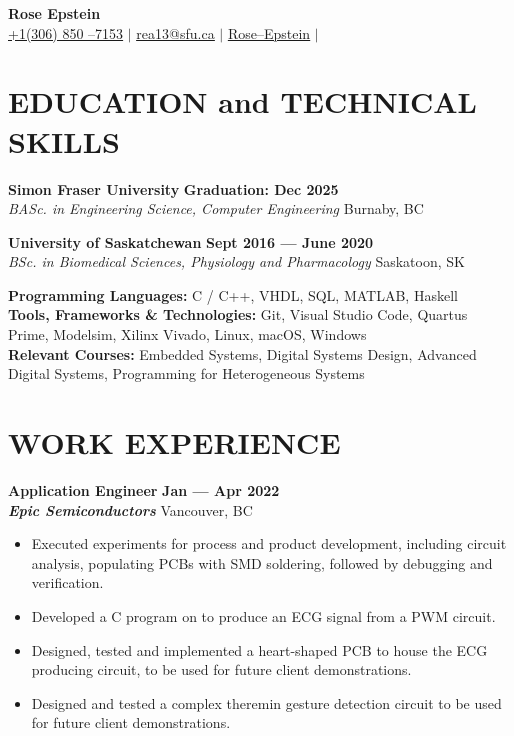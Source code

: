 \documentclass[letterpaper,11pt]{article}
\newcommand{\contact} [4] {
    \begin{center}
        \textbf{\color{colorValue}\Huge #1} \\ \vspace{1pt}
        \small {\faIcon{phone} \underline{#2}} $|$ \href{mailto:#3}{\faIcon{envelope} \underline{#3}} $|$ 
        \href{#4}{\faIcon{linkedin} \underline{Rose--Epstein}} $|$
    \end{center}
}
\newcommand{\Item} [1] {
    \item\small{{#1 \vspace{-2pt}}}
}
\newcommand{\employer} [5] {
    {\textbf{#3} \hfill \textbf{#4 --- #5}\\ \textbf{\emph{#1}} \hfill #2\\}
}
\newcommand{\school} [4] {
    {\textbf{#1} \hfill \textbf{#2}\\ \emph{#3} \hfill #4\\}
}
\newcommand{\workItemListStart} [0] {
    \vspace{-1pt}
    \begin{itemize}[topsep=0pt,itemsep=-2pt]
}
\newcommand{\workItemListEnd} [0] {
    \end{itemize}
    \vspace{1pt}
}
\begin{document}
    \vspace*{-30pt}

    \contact{Rose Epstein}{+1(306) 850 --7153}{rea13@sfu.ca}{https://www.linkedin.com/in/rose-epstein/}

    \section{EDUCATION and TECHNICAL SKILLS}
    \school{Simon Fraser University}{Graduation: Dec 2025}{BASc. in Engineering Science, Computer Engineering}{Burnaby, BC}
    \school{University of Saskatchewan}{Sept 2016 --- June 2020}{BSc. in Biomedical Sciences, Physiology and Pharmacology}{Saskatoon, SK}
    \begin{itemize}[leftmargin=0in, label={}]
    \small{\item{
        \textbf{Programming Languages:}{ C / C++, VHDL, SQL, MATLAB, Haskell} \\
        \textbf{Tools, Frameworks \& Technologies:}{ Git, Visual Studio Code, Quartus Prime, Modelsim, Xilinx Vivado, Linux, macOS, Windows} \\
        \textbf{Relevant Courses:}{ Embedded Systems, Digital Systems Design, Advanced Digital Systems, Programming for Heterogeneous Systems} \\
    }}
    \end{itemize}

    \section{WORK EXPERIENCE}
    \employer{Epic Semiconductors}{Vancouver, BC}{Application Engineer}{Jan}{Apr 2022}
    \workItemListStart{}
        \Item{Executed experiments for process and product development, including circuit analysis, populating PCBs with SMD soldering, followed by debugging and verification.}
        \Item{Developed a C program on to produce an ECG signal from a PWM circuit.}
        \Item{Designed, tested and implemented a heart-shaped PCB to house the ECG producing circuit, to be used for future client demonstrations.}
        \Item{Designed and tested a complex theremin gesture detection circuit to be used for future client demonstrations.}
        \workItemListEnd{}
\end{document}
